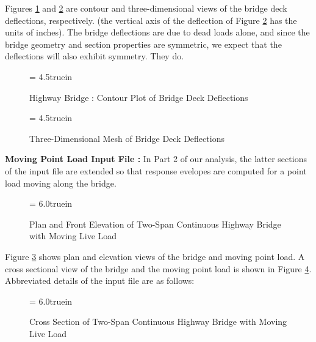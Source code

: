 \vspace{0.24 in}\noindent
Figures \ref{fig: bridge-deck-deflection-part1} and \ref{fig: bridge-deck-deflection-part2}
are contour and three-dimensional views of the bridge deck deflections, respectively.
(the vertical axis of the deflection of Figure \ref{fig: bridge-deck-deflection-part2}
has the units of inches).
The bridge deflections are due to dead loads alone, and since
the bridge geometry and section properties are symmetric,
we expect that the deflections will also exhibit symmetry. They do.

\clearpage
\begin{figure}[th]
\epsfxsize= 4.5truein
\centerline{}
\vspace{0.20 in}
\caption{Highway Bridge : Contour Plot of Bridge Deck Deflections}
\label{fig: bridge-deck-deflection-part1}
\end{figure}

\begin{figure}[h]
\epsfxsize= 4.5truein
\centerline{}
\vspace{0.20 in}
\caption{Three-Dimensional Mesh of Bridge Deck Deflections}
\label{fig: bridge-deck-deflection-part2}
\end{figure}

\clearpage
\vspace{0.15 in}\noindent
{\bf Moving Point Load Input File :}
In Part 2 of our analysis, the latter sections of the input file are
extended so that response evelopes are computed for a point load
moving along the bridge.

\begin{figure}[h]
\epsfxsize= 6.0truein
\centerline{}
\vspace{0.20 in}
\caption{Plan and Front Elevation of Two-Span Continuous Highway Bridge with Moving Live Load}
\label{fig: bridge-moving-load-part1}
\end{figure}

\vspace{0.15 in}\noindent
Figure \ref{fig: bridge-moving-load-part1} shows plan and elevation views
of the bridge and moving point load. A cross sectional view of
the bridge and the moving point load is
shown in Figure \ref{fig: bridge-moving-load-part2}.
Abbreviated details of the input file are as follows:

\begin{figure}[ht]
\epsfxsize= 6.0truein
\centerline{}
\vspace{0.20 in}
\caption{Cross Section of Two-Span Continuous Highway Bridge with Moving Live Load}
\label{fig: bridge-moving-load-part2}
\end{figure}

